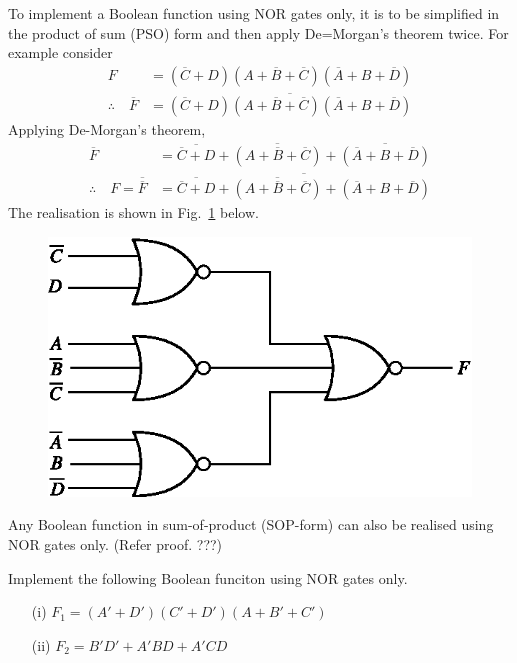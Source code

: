 To implement a Boolean function using NOR gates only, it is to be simplified in the product of sum (PSO) form and then apply De=Morgan's theorem twice. For example consider
\begin{align*}
F &= (\overline{C}+D)(A+\overline{B}+\overline{C})(\overline{A}+B+\overline{D})\\[3pt]
\therefore\quad \overline{F} &= \overline{(\overline{C}+D)(A+\overline{B}+\overline{C})(\overline{A}+B+\overline{D})}
\end{align*}
Applying De-Morgan's theorem,
\begin{align*}
\overline{F} &= \overline{\overline{C}+D}+\overline{(A+\overline{B}+\overline{C})}+\overline{(\overline{A}+B+\overline{D})}\\[3pt]
\therefore\quad F=\overline{\overline{F}} &= \overline{\overline{\overline{C}+D}+\overline{(A+\overline{B}+\overline{C})}+(\overline{A}+B+\overline{D})}
\end{align*}
The realisation is shown in Fig.~\ref{fig5.23} below.
\begin{figure}[H]
\centering
\includegraphics{chap5/fig8.eps}
\caption{}\label{fig5.23}
\end{figure}

Any Boolean function in sum-of-product (SOP-form) can also be realised using NOR gates only. (Refer proof. ???)

\begin{problem}
Implement the following Boolean funciton using NOR gates only.
\begin{itemize}
\item[(i)] $F_{1}=(A'+D')(C'+D')(A+B'+C')$

\item[(ii)] $F_{2}=B'D'+A'BD+A'CD$
\end{itemize}
\end{problem}

